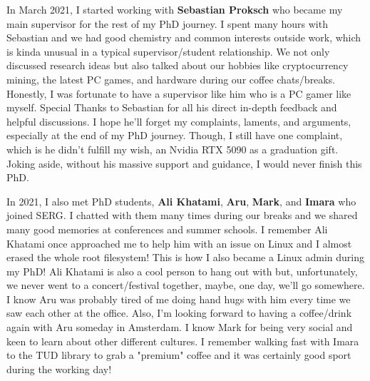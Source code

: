 In March 2021, I started working with \textbf{Sebastian Proksch} who became my main supervisor for the rest of my PhD journey. I spent many hours with Sebastian and we had good chemistry and common interests outside work, which is kinda unusual in a typical supervisor/student relationship. We not only discussed research ideas but also talked about our hobbies like cryptocurrency mining, the latest PC games, and hardware during our coffee chats/breaks. Honestly, I was fortunate to have a supervisor like him who is a PC gamer like myself. Special Thanks to Sebastian for all his direct in-depth feedback and helpful discussions. I hope he'll forget my complaints, laments, and arguments, especially at the end of my PhD journey. Though, I still have one complaint, which is he didn't fulfill my wish, an Nvidia RTX 5090 as a graduation gift. Joking aside, without his massive support and guidance, I would never finish this PhD. 

In 2021, I also met PhD students, \textbf{Ali Khatami}, \textbf{Aru}, \textbf{Mark}, and \textbf{Imara} who joined SERG. I chatted with them many times during our breaks and we shared many good memories at conferences and summer schools. I remember Ali Khatami once approached me to help him with an issue on Linux and I almost erased the whole root filesystem! This is how I also became a Linux admin during my PhD! Ali Khatami is also a cool person to hang out with but, unfortunately, we never went to a concert/festival together, maybe, one day, we'll go somewhere. I know Aru was probably tired of me doing hand hugs with him every time we saw each other at the office. Also, I'm looking forward to having a coffee/drink again with Aru someday in Amsterdam. I know Mark for being very social and keen to learn about other different cultures. I remember walking fast with Imara to the TUD library to grab a "premium" coffee and it was certainly good sport during the working day!

